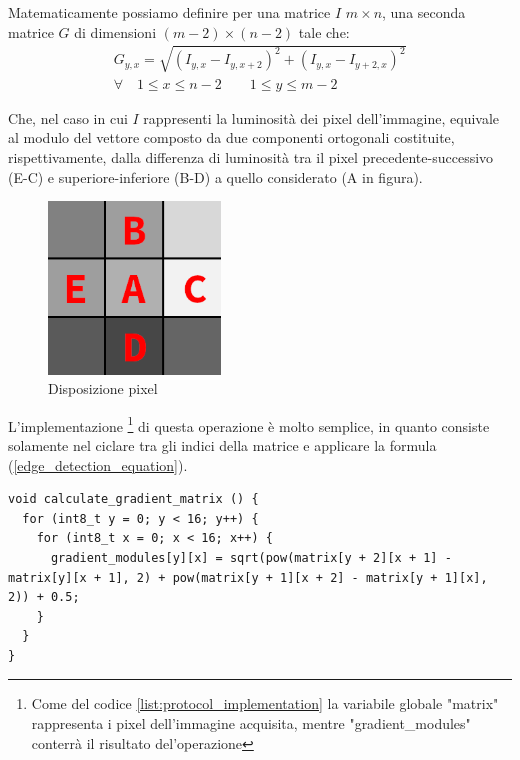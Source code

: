 \documentclass[12pt]{article}
\newenvironment{changemargin}[2]{%
    \begin{list}{}{%
    \setlength{\topsep}{0pt}%
    \setlength{\leftmargin}{#1}%
    \setlength{\rightmargin}{#2}%
    \setlength{\listparindent}{\parindent}%
    \setlength{\itemindent}{\parindent}%
    \setlength{\parsep}{\parskip}%
    }%
    \item[]}{\end{list}}
\begin{document}
        Matematicamente possiamo definire per una matrice $I$ $m \times n$, una seconda matrice $G$ di dimensioni $(m-2) \times (n-2)$ tale che:
        \begin{equation}\label{edge_detection_equation}
        \begin{split}
            G_{y, x} = \sqrt{\left(I_{y, x} - I_{y, x+2}\right)^2 + \left( I_{y, x} - I_{y+2, x} \right)^2} \\
            \forall \quad 1 \leq x \leq n-2 \qquad
            1 \leq y \leq m-2
        \end{split}
        \end{equation} 
        
        Che, nel caso in cui $I$ rappresenti la luminosità dei pixel dell'immagine, equivale al modulo del vettore composto da due componenti ortogonali costituite, rispettivamente, dalla differenza di luminosità tra il pixel precedente-successivo (E-C) e superiore-inferiore (B-D) a quello considerato (A in figura).
        
        \begin{figure}[h]
        \centering
            \includegraphics[width=130pt]{Draws/Edge_detection_pixel_label.png}
            \caption{Disposizione pixel}
        \end{figure}
        
        L'implementazione \footnote{Come del codice \ref{list:protocol_implementation} la variabile globale "matrix" rappresenta i pixel dell'immagine acquisita, mentre "gradient\_modules" conterrà il risultato del'operazione} di questa operazione è molto semplice, in quanto consiste solamente nel ciclare tra gli indici della matrice e applicare la formula (\ref{edge_detection_equation}).
        \begin{changemargin}{-2cm}{-2cm}
        \begin{lstlisting}[label={list:edge_detection_code}, style=Arduino, caption=Calcolo matrice edge-detection, basicstyle=\scriptsize]
void calculate_gradient_matrix () {
  for (int8_t y = 0; y < 16; y++) {
    for (int8_t x = 0; x < 16; x++) {
      gradient_modules[y][x] = sqrt(pow(matrix[y + 2][x + 1] - matrix[y][x + 1], 2) + pow(matrix[y + 1][x + 2] - matrix[y + 1][x], 2)) + 0.5;
    }
  }
}       \end{lstlisting}
        \end{changemargin}
        
\end{document}
